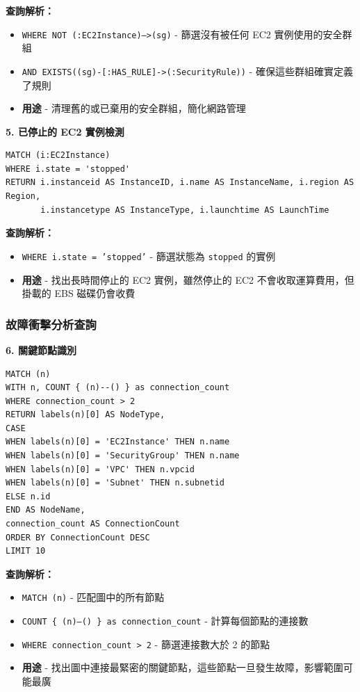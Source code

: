 \documentclass[11pt,a4paper]{ctexart}
\begin{document}
\textbf{查詢解析：}
\begin{itemize}[leftmargin=1.5em]
\item \texttt{WHERE NOT (:EC2Instance)-->(sg)} - 篩選沒有被任何 EC2 實例使用的安全群組
\item \texttt{AND EXISTS((sg)-[:HAS\_RULE]->(:SecurityRule))} - 確保這些群組確實定義了規則
\item \textbf{用途} - 清理舊的或已棄用的安全群組，簡化網路管理
\end{itemize}

\textbf{5. 已停止的 EC2 實例檢測}

\begin{lstlisting}[language=Cypher,caption={找出已停止的 EC2 執行個體}]
MATCH (i:EC2Instance) 
WHERE i.state = 'stopped'
RETURN i.instanceid AS InstanceID, i.name AS InstanceName, i.region AS Region, 
       i.instancetype AS InstanceType, i.launchtime AS LaunchTime
\end{lstlisting}

\textbf{查詢解析：}
\begin{itemize}[leftmargin=1.5em]
\item \texttt{WHERE i.state = 'stopped'} - 篩選狀態為 \texttt{stopped} 的實例
\item \textbf{用途} - 找出長時間停止的 EC2 實例，雖然停止的 EC2 不會收取運算費用，但掛載的 EBS 磁碟仍會收費
\end{itemize}

\subsubsection{故障衝擊分析查詢}

\textbf{6. 關鍵節點識別}

\begin{lstlisting}[language=Cypher,caption={找出關鍵節點}]
MATCH (n)
WITH n, COUNT { (n)--() } as connection_count
WHERE connection_count > 2
RETURN labels(n)[0] AS NodeType,
CASE
WHEN labels(n)[0] = 'EC2Instance' THEN n.name
WHEN labels(n)[0] = 'SecurityGroup' THEN n.name
WHEN labels(n)[0] = 'VPC' THEN n.vpcid
WHEN labels(n)[0] = 'Subnet' THEN n.subnetid
ELSE n.id
END AS NodeName,
connection_count AS ConnectionCount
ORDER BY ConnectionCount DESC
LIMIT 10
\end{lstlisting}

\textbf{查詢解析：}
\begin{itemize}[leftmargin=1.5em]
\item \texttt{MATCH (n)} - 匹配圖中的所有節點
\item \texttt{COUNT \{ (n)--() \} as connection\_count} - 計算每個節點的連接數
\item \texttt{WHERE connection\_count > 2} - 篩選連接數大於 2 的節點
\item \textbf{用途} - 找出圖中連接最緊密的關鍵節點，這些節點一旦發生故障，影響範圍可能最廣
\end{itemize}
\end{document}
